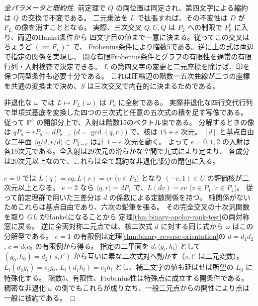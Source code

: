 \begin{proof}[全パラメータと既約性]
前定理で $Q$ の両位置は同定され、第四文字による縮約は $Q$ の交換で不変である。
二元乗法を $L$ で拡張すれば、その不変性は $D$ が $F_L$ の像を消すこととなる。
実際、三次交叉 $Q,U,Q$ は $P_2$ への制限で $P_8^*$ に入り、両辺のHankel条件から
四文字目の値まで一意に決まる。従ってこの交叉はちょうど $(\operatorname{im}F_L)^\perp$ で、
Frobenius条件により階数5である。逆に上の式は両辺で指定の関係を実現し、
開な有限Frobenius条件とグラフの有限性を通常の有限行列・入射検査で決定できる。
$L$ の第四文字の変更と二元座標を除けば、印を保つ同型条件も必要十分である。
これは圧縮辺の階数一五次曲線が二つの座標を共通の変換まで決め、$S$ は三次交叉で内在的に決まるためである。

非退化な $\omega$ では $L\mapsto F_L(\omega)$ は $P_8$ に全射である。
実際非退化な四行交代行列で単項式基底を変換した四つの三次式と任意の五次式の積を足す写像である。
従って $\mathbb P^5$ の開部分上で、入射は階数15のベクトル束である。
分解するときの像は $qP_5+rP_5=dP_{8-e}$ ($d=\gcd(q,r)$) で、核は $15+e$ 次元。
$[d]$ と基点自由な二平面 $\langle q/d,r/d\rangle\subset P_{3-e}$ は計 $4-e$ 次元を動く。
よって $e=0,1,2$ の入射は各19次元である。全入射は29次元の滑らかな空間で九式により定まり、
各成分は20次元以上なので、これらは全て既約な非退化部分の閉包に入る。

$e=0$ では $L(q)=cq,L(r)=cr$ ($c\in P_2$) となり $(-c,1)\in U$ の評価核が二次元以上となる。
$e=2$ なら $\langle q,r\rangle=dP_1$ で、$L(dv)=cv$ ($v\in P_1$, $c\in P_4$)。
従って前定理群で用いた三差分は $d$ の係数による定数関係を持つ。
純関係がないためこれらは基点自由であり、六次の鉛筆を張る。
その完全交叉の十次汎関数を取り $GL$ がHankelになることから
定理\ref{thm:binary-apolar-rank-test}の両対称窓に戻る。
逆に全両対称二元点では、核二次式 $d$ に対する同じ式から $\omega$ はこの分解型である。
$e=1$ の有限例は定理\ref{thm:binary-reverse-orientation}の $d=d_1d_2$, $c=d_2c_3$ の有限例から得る。
指定の二平面を $d_1\langle g_t,h_t\rangle$ として
$(g_0,h_0)=d_2(s,t')$ から互いに素な二次式対へ動かす（$s,t'$ は二元変数）。
$L_t(d_1g_t)=c_3g_t$, $L_t(d_1h_t)=c_3h_t$ とし、補二文字の値も延ばせば所望の $L_0$ に特殊化する。
階数5、有限性、Frobenius性は特殊点に成立する開条件である。
稠密な非退化 $\omega$ の側でもこれらが成り立ち、一般二元点からの開性により点は一般に被約である。
\end{proof}
